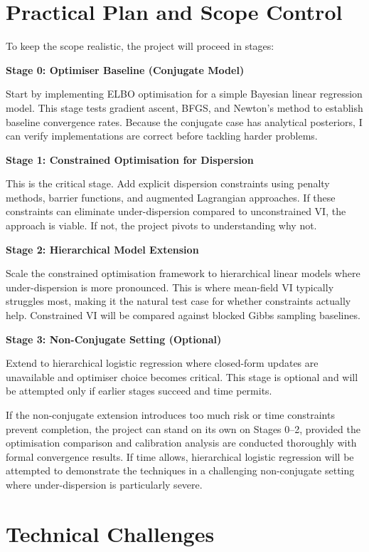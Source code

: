 \documentclass[11pt,a4paper]{article}
\begin{document}
\section{Practical Plan and Scope Control}

To keep the scope realistic, the project will proceed in stages:

\textbf{Stage 0: Optimiser Baseline (Conjugate Model)}

Start by implementing ELBO optimisation for a simple Bayesian linear regression model. This stage tests gradient ascent, BFGS, and Newton's method to establish baseline convergence rates. Because the conjugate case has analytical posteriors, I can verify implementations are correct before tackling harder problems.

\textbf{Stage 1: Constrained Optimisation for Dispersion}

This is the critical stage. Add explicit dispersion constraints using penalty methods, barrier functions, and augmented Lagrangian approaches. If these constraints can eliminate under-dispersion compared to unconstrained VI, the approach is viable. If not, the project pivots to understanding why not.

\textbf{Stage 2: Hierarchical Model Extension}

Scale the constrained optimisation framework to hierarchical linear models where under-dispersion is more pronounced. This is where mean-field VI typically struggles most, making it the natural test case for whether constraints actually help. Constrained VI will be compared against blocked Gibbs sampling baselines.

\textbf{Stage 3: Non-Conjugate Setting (Optional)}

Extend to hierarchical logistic regression where closed-form updates are unavailable and optimiser choice becomes critical. This stage is optional and will be attempted only if earlier stages succeed and time permits.

If the non-conjugate extension introduces too much risk or time constraints prevent completion, the project can stand on its own on Stages 0--2, provided the optimisation comparison and calibration analysis are conducted thoroughly with formal convergence results. If time allows, hierarchical logistic regression will be attempted to demonstrate the techniques in a challenging non-conjugate setting where under-dispersion is particularly severe.

\section{Technical Challenges}
\end{document}

